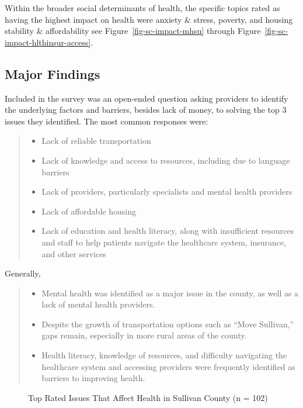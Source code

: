 \documentclass[
  english,
  letterpaper,
]{report}
\begin{document}
Within the broader social determinants of health, the specific topics
rated as having the highest impact on health were anxiety \& stress,
poverty, and housing stability \& affordability see
Figure~\ref{fig-sc-impact-mhsu} through
Figure~\ref{fig-sc-impact-hlthinsur-access}.

\subsection{Major Findings}\label{major-findings-4}

Included in the survey was an open-ended question asking providers to
identify the underlying factors and barriers, besides lack of money, to
solving the top 3 issues they identified. The most common responses
were:

\begin{quote}
\begin{itemize}
\item
  Lack of reliable transportation
\item
  Lack of knowledge and access to resources, including due to language
  barriers
\item
  Lack of providers, particularly specialists and mental health
  providers
\item
  Lack of affordable housing
\item
  Lack of education and health literacy, along with insufficient
  resources and staff to help patients navigate the healthcare system,
  insurance, and other services
\end{itemize}
\end{quote}

Generally,

\begin{quote}
\begin{itemize}
\item
  Mental health was identified as a major issue in the county, as well
  as a lack of mental health providers.
\item
  Despite the growth of transportation options such as ``Move
  Sullivan,'' gaps remain, especially in more rural areas of the county.
\item
  Health literacy, knowledge of resources, and difficulty navigating the
  healthcare system and accessing providers were frequently identified
  as barriers to improving health.
\end{itemize}
\end{quote}

\begin{figure}


\caption{\label{fig-sc-affect-health}Top Rated Issues That Affect Health
in Sullivan County (n = 102)}

\end{figure}%
\end{document}
